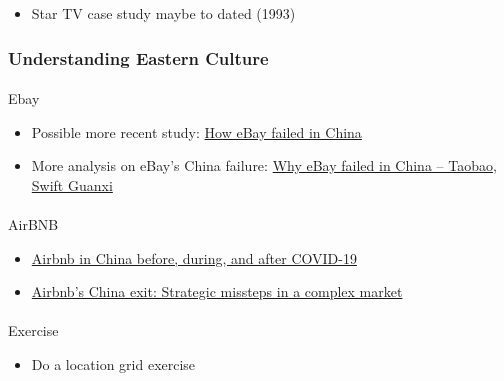\documentclass[
  11pt,
]{article}
\makeatletter
\let\oldparagraph\paragraph
\renewcommand{\paragraph}{
    \@ifstar
      \xxxParagraphStar
      \xxxParagraphNoStar
  }
\newcommand{\xxxParagraphStar}[1]{\oldparagraph*{#1}\mbox{}}
\newcommand{\xxxParagraphNoStar}[1]{\oldparagraph{#1}\mbox{}}
\providecommand{\tightlist}{%
  \setlength{\itemsep}{0pt}\setlength{\parskip}{0pt}}
\makeatother
\begin{document}
\begin{itemize}
\tightlist
\item
  Star TV case study maybe to dated (1993)
\end{itemize}

\subsubsection{Understanding Eastern
Culture}\label{understanding-eastern-culture}

\paragraph{Ebay}\label{ebay}

\begin{itemize}
\tightlist
\item
  Possible more recent study:
  \href{https://www.forbes.com/sites/helenwang/2010/09/12/how-ebay-failed-in-china/}{How
  eBay failed in China}
\item
  More analysis on eBay's China failure:
  \href{https://psmag.com/economics/why-ebay-failed-in-china-taobao-swift-guanxi-60072/}{Why
  eBay failed in China -- Taobao, Swift Guanxi}
\end{itemize}

\paragraph{AirBNB}\label{airbnb}

\begin{itemize}
\tightlist
\item
  \href{https://uq.pressbooks.pub/airbnb-978-1-74272-321-1/chapter/airbnb-in-china-before-during-and-after-covid-19/}{Airbnb
  in China before, during, and after COVID-19}
\item
  \href{https://medium.com/eastora-insights/airbnbs-china-exit-strategic-missteps-in-a-complex-market-86a26602e08d}{Airbnb's
  China exit: Strategic missteps in a complex market}
\end{itemize}

\paragraph{Exercise}\label{exercise}

\begin{itemize}
\tightlist
\item
  Do a location grid exercise
\end{itemize}
\end{document}
